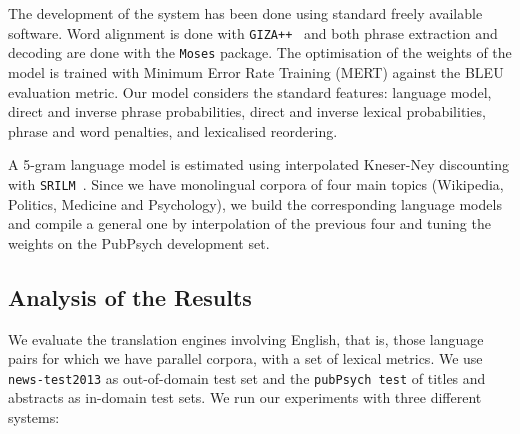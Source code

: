 \documentclass[a4paper,11pt]{article}
\begin{document}
The development of the system has been done using standard freely available software. 
Word alignment is done with {\tt GIZA++}~\cite{giza} and both phrase extraction and decoding are done with the {\tt Moses} package. The optimisation of the weights of the model is trained with  Minimum Error Rate Training (MERT) \cite{och2003} against the BLEU evaluation metric.  Our model considers the standard features: language model, direct and inverse phrase probabilities, direct and inverse lexical probabilities, phrase and word penalties, and lexicalised reordering.

A 5-gram language model is estimated using interpolated Kneser-Ney discounting with {\tt SRILM}~\cite{srilm}. Since we have monolingual corpora of four main topics (Wikipedia, Politics, Medicine and Psychology), we build the corresponding language models and compile a general one by interpolation of the previous four and tuning the weights on the PubPsych development set.


\subsection{Analysis of the Results}
\label{ss:smtResults}

We evaluate the translation engines involving English, that is, those language pairs for which we have parallel corpora, with a set of lexical metrics. We use {\tt news-test2013} as out-of-domain test set and the {\tt pubPsych test} of titles and abstracts as in-domain test sets.  We run our experiments with three different systems:
 
\end{document}
